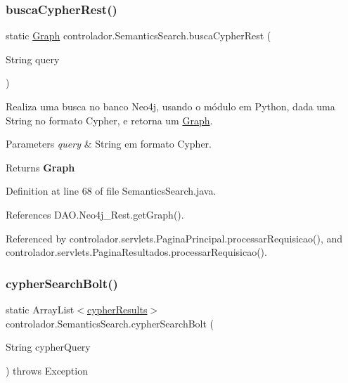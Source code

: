 \subsubsection{\texorpdfstring{busca\+Cypher\+Rest()}{buscaCypherRest()}}
{\footnotesize\ttfamily static \hyperlink{classentidade_1_1Graph}{Graph} controlador.\+Semantics\+Search.\+busca\+Cypher\+Rest (\begin{DoxyParamCaption}\item[{String}]{query }\end{DoxyParamCaption})\hspace{0.3cm}{\ttfamily [static]}}

Realiza uma busca no banco Neo4j, usando o módulo em Python, dada uma String no formato Cypher, e retorna um \hyperlink{}{Graph}.


\begin{DoxyParams}{Parameters}
{\em query} & String em formato Cypher. \\
\hline
\end{DoxyParams}
\begin{DoxyReturn}{Returns}
{\bfseries Graph} 
\end{DoxyReturn}


Definition at line 68 of file Semantics\+Search.\+java.



References D\+A\+O.\+Neo4j\+\_\+\+Rest.\+get\+Graph().



Referenced by controlador.\+servlets.\+Pagina\+Principal.\+processar\+Requisicao(), and controlador.\+servlets.\+Pagina\+Resultados.\+processar\+Requisicao().

\hypertarget{classcontrolador_1_1SemanticsSearch_a339848789ce165207406c6ee6f49c538}{}\label{classcontrolador_1_1SemanticsSearch_a339848789ce165207406c6ee6f49c538} 
\subsubsection{\texorpdfstring{cypher\+Search\+Bolt()}{cypherSearchBolt()}}
{\footnotesize\ttfamily static Array\+List$<$\hyperlink{classentidade_1_1resultados_1_1cypherResults}{cypher\+Results}$>$ controlador.\+Semantics\+Search.\+cypher\+Search\+Bolt (\begin{DoxyParamCaption}\item[{String}]{cypher\+Query }\end{DoxyParamCaption}) throws Exception\hspace{0.3cm}{\ttfamily [static]}}


